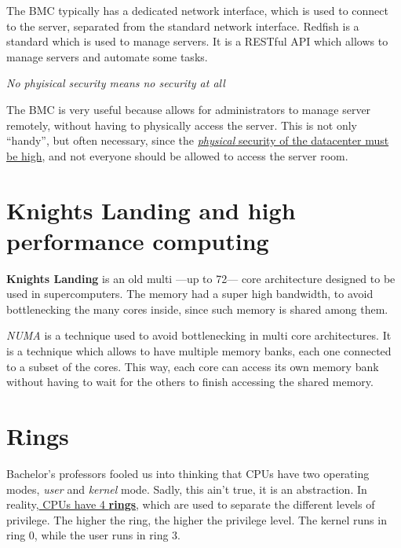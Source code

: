 The BMC typically has a dedicated network interface, which is used to connect to the server, separated from the standard network interface.
Redfish is a standard which is used to manage servers. It is a RESTful API which allows to manage servers and automate some tasks.

\nl

\begin{center}
   \textit{No phyisical security means no security at all}
\end{center}
The BMC is very useful because allows for administrators to manage server remotely, without having to physically access the server.
This is not only ``handy'', but often necessary, since the \ul{\textit{physical} security of the datacenter must be high}, and not everyone should be allowed to access the server room.


\section{Knights Landing and high performance computing}
\textbf{Knights Landing} is an old multi ---up to 72--- core architecture designed to be used in supercomputers. The memory had a super high bandwidth, to avoid bottlenecking the many cores inside, since such memory is shared among them.

\textit{NUMA} is a technique used to avoid bottlenecking in multi core architectures. It is a technique which allows to have multiple memory banks, each one connected to a subset of the cores. This way, each core can access its own memory bank without having to wait for the others to finish accessing the shared memory.



\section{Rings}
Bachelor's professors fooled us into thinking that CPUs have two operating modes, \textit{user} and \textit{kernel} mode. Sadly, this ain't true, it is an abstraction. In reality,\ul{ CPUs have 4 \textbf{rings}}, which are used to separate the different levels of privilege. The higher the ring, the higher the privilege level.
The kernel runs in ring 0, while the user runs in ring 3.

